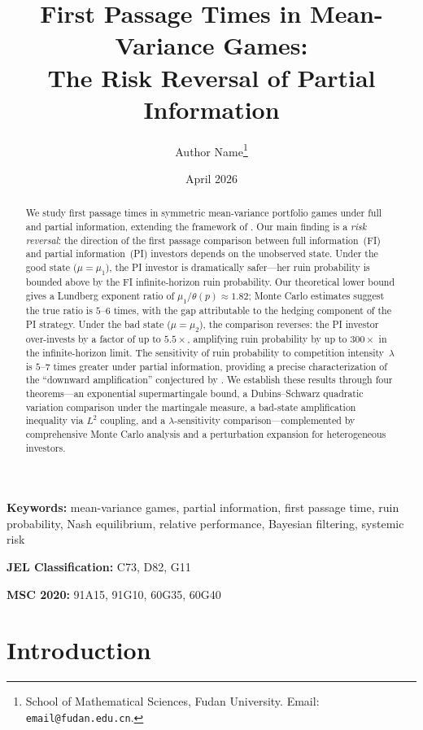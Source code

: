 \documentclass[12pt]{article}
\title{First Passage Times in Mean-Variance Games:\\
The Risk Reversal of Partial Information}
\author{%
  Author Name\thanks{School of Mathematical Sciences, Fudan University.
  Email: \texttt{email@fudan.edu.cn}.}
}
\date{April 2026}
\theoremstyle{remark}
\theoremstyle{definition}
\begin{document}
\maketitle

\begin{abstract}
We study first passage times in symmetric mean-variance portfolio games
under full and partial information, extending the framework of
\citet{HuangSun2025}.
Our main finding is a \emph{risk reversal}: the direction of the
first passage comparison between full information~(FI) and partial
information~(PI) investors depends on the unobserved state.
Under the good state ($\mu = \mu_1$), the PI investor is dramatically
safer---her ruin probability is bounded above by the FI infinite-horizon
ruin probability. Our theoretical lower bound gives a Lundberg exponent
ratio of $\mu_1/\theta(p) \approx 1.82$; Monte Carlo estimates suggest
the true ratio is $5$--$6$ times, with the gap attributable to the
hedging component of the PI strategy.
Under the bad state ($\mu = \mu_2$), the comparison reverses: the PI
investor over-invests by a factor of up to $5.5\times$, amplifying ruin
probability by up to $300\times$ in the infinite-horizon limit.
The sensitivity of ruin probability to competition intensity~$\lambda$
is $5$--$7$ times greater under partial information, providing a precise
characterization of the ``downward amplification'' conjectured by
\citet{HuangSun2025}.
We establish these results through four theorems---an exponential
supermartingale bound, a Dubins--Schwarz quadratic variation comparison
under the martingale measure, a bad-state amplification inequality via
$L^2$ coupling, and a $\lambda$-sensitivity comparison---complemented
by comprehensive Monte Carlo analysis and a perturbation expansion for
heterogeneous investors.
\end{abstract}

\bigskip
\noindent\textbf{Keywords:}
mean-variance games, partial information, first passage time,
ruin probability, Nash equilibrium, relative performance, Bayesian filtering,
systemic risk

\bigskip
\noindent\textbf{JEL Classification:} C73, D82, G11

\bigskip
\noindent\textbf{MSC 2020:} 91A15, 91G10, 60G35, 60G40

\newpage

\section{Introduction}\label{sec:intro}
\end{document}
